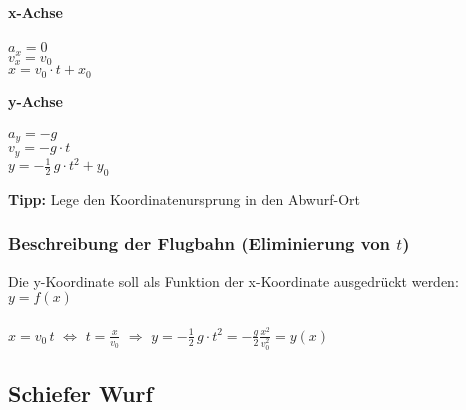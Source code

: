 		\begin{minipage}{0.45\linewidth}
			\textbf{x-Achse} \\
				\\
				$a_x = 0$ \\
				$v_x = v_0$ \\
				$x = v_0 \cdot t + x_0$ \\
		\end{minipage}	
		\hfill	
		\begin{minipage}{0.45\linewidth}
			\textbf{y-Achse} \\
				\\
				$a_y = -g$ \\
				$v_y = -g \cdot t$ \\
				$y = - \frac{1}{2} \, g \cdot t^2 + y_0$ \\
		\end{minipage}	
		
		\textbf{Tipp:} Lege den Koordinatenursprung in den Abwurf-Ort
	
		\subsubsection{Beschreibung der Flugbahn (Eliminierung von $t$)}	
			Die y-Koordinate soll als Funktion der x-Koordinate ausgedrückt werden: $y = f(x)$ \\
			\\
			$x = v_0 \, t$ \quad $\Leftrightarrow$ \quad $t = \frac{x}{v_0}$ \quad $\Rightarrow$ \quad $y = - \frac{1}{2} \, g \cdot t^2 = - \frac{g}{2} \frac{x^2}{v_0^2} = y(x)$
			
	\subsection{Schiefer Wurf}
	
